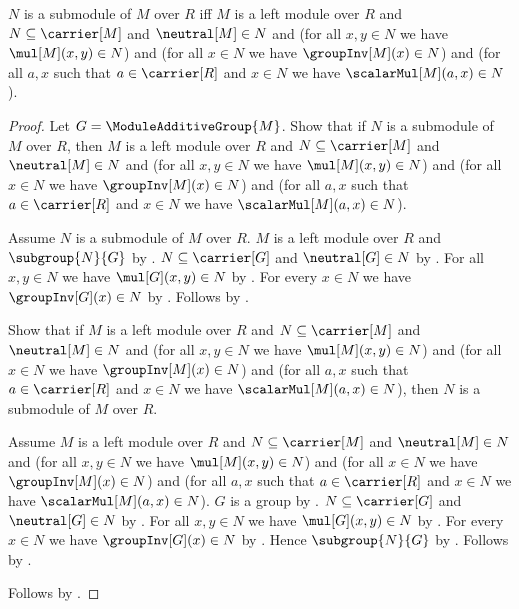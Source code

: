 \begin{theorem}\label{submodule_expanded_iff}
    $N$ is a submodule of $M$ over $R$ iff
        $M$ is a left module over $R$ and
        $N\subseteq\carrier[M]$ and
        $\neutral[M]\in N$ and
        (for all $x,y\in N$ we have $\mul[M](x,y)\in N$) and
        (for all $x\in N$ we have $\groupInv[M](x)\in N$) and
        (for all $a,x$ such that
            $a\in\carrier[R]$ and $x\in N$ we have
            $\scalarMul[M](a,x)\in N$).
\end{theorem}
\begin{proof}
    Let $G=\ModuleAdditiveGroup{M}$.
    Show that if $N$ is a submodule of $M$ over $R$, then
        $M$ is a left module over $R$ and
        $N\subseteq\carrier[M]$ and
        $\neutral[M]\in N$ and
        (for all $x,y\in N$ we have $\mul[M](x,y)\in N$) and
        (for all $x\in N$ we have $\groupInv[M](x)\in N$) and
        (for all $a,x$ such that $a\in\carrier[R]$ and $x\in N$
            we have $\scalarMul[M](a,x)\in N$).
    \begin{subproof}
        Assume $N$ is a submodule of $M$ over $R$.
        $M$ is a left module over $R$ and $\subgroup{N}{G}$ by
            .
        $N\subseteq\carrier[G]$ and $\neutral[G]\in N$ by
            .
        For all $x,y\in N$ we have $\mul[G](x,y)\in N$ by
            .
        For every $x\in N$ we have $\groupInv[G](x)\in N$ by
            .
        Follows by
            .
    \end{subproof}
    Show that if
        $M$ is a left module over $R$ and
        $N\subseteq\carrier[M]$ and
        $\neutral[M]\in N$ and
        (for all $x,y\in N$ we have $\mul[M](x,y)\in N$) and
        (for all $x\in N$ we have $\groupInv[M](x)\in N$) and
        (for all $a,x$ such that $a\in\carrier[R]$ and $x\in N$
            we have $\scalarMul[M](a,x)\in N$),
        then $N$ is a submodule of $M$ over $R$.
    \begin{subproof}
        Assume
            $M$ is a left module over $R$ and
            $N\subseteq\carrier[M]$ and
            $\neutral[M]\in N$ and
            (for all $x,y\in N$ we have $\mul[M](x,y)\in N$) and
            (for all $x\in N$ we have $\groupInv[M](x)\in N$) and
            (for all $a,x$ such that $a\in\carrier[R]$ and $x\in N$
                we have $\scalarMul[M](a,x)\in N$).
        $G$ is a group by .
        $N\subseteq\carrier[G]$ and $\neutral[G]\in N$ by
            .
        For all $x,y\in N$ we have $\mul[G](x,y)\in N$ by
            .
        For every $x\in N$ we have $\groupInv[G](x)\in N$ by
            .
        Hence $\subgroup{N}{G}$ by .
        Follows by .
    \end{subproof}
    Follows by \auto.
\end{proof}

